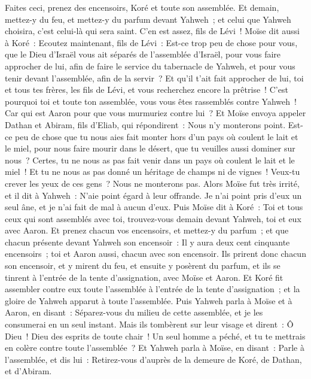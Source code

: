 \begin{multicols}{2}
Faites ceci, prenez des encensoirs, Koré et toute son assemblée.
Et demain, mettez-y du feu, et mettez-y du parfum devant Yahweh~; et celui que Yahweh choisira, c'est celui-là qui sera saint. C'en est assez, fils de Lévi~!
Moïse dit aussi à Koré~: Ecoutez maintenant, fils de Lévi~:
Est-ce trop peu de chose pour vous, que le Dieu d'Israël vous ait séparés de l'assemblée d'Israël, pour vous faire approcher de lui, afin de faire le service du tabernacle de Yahweh, et pour vous tenir devant l'assemblée, afin de la servir~?
Et qu'il t'ait fait approcher de lui, toi et tous tes frères, les fils de Lévi, et vous recherchez encore la prêtrise~!
C'est pourquoi toi et toute ton assemblée, vous vous êtes rassemblés contre Yahweh~! Car qui est Aaron pour que vous murmuriez contre lui~?
Et Moïse envoya appeler Dathan et Abiram, fils d'Eliab, qui répondirent~: Nous n'y monterons point.
Est-ce peu de chose que tu nous aies fait monter hors d'un pays où coulent le lait et le miel, pour nous faire mourir dans le désert, que tu veuilles aussi dominer sur nous~?
Certes, tu ne nous as pas fait venir dans un pays où coulent le lait et le miel~! Et tu ne nous as pas donné un héritage de champs ni de vignes~! Veux-tu crever les yeux de ces gens~? Nous ne monterons pas.
Alors Moïse fut très irrité, et il dit à Yahweh~: N'aie point égard à leur offrande. Je n'ai point pris d'eux un seul âne, et je n'ai fait de mal à aucun d'eux.
Puis Moïse dit à Koré~: Toi et tous ceux qui sont assemblés avec toi, trouvez-vous demain devant Yahweh, toi et eux avec Aaron.
Et prenez chacun vos encensoirs, et mettez-y du parfum~; et que chacun présente devant Yahweh son encensoir~: Il y aura deux cent cinquante encensoirs~; toi et Aaron aussi, chacun avec son encensoir.
Ils prirent donc chacun son encensoir, et y mirent du feu, et ensuite y posèrent du parfum, et ils se tinrent à l'entrée de la tente d'assignation, avec Moïse et Aaron.
Et Koré fit assembler contre eux toute l'assemblée à l'entrée de la tente d'assignation~; et la gloire de Yahweh apparut à toute l'assemblée.
Puis Yahweh parla à Moïse et à Aaron, en disant~:
Séparez-vous du milieu de cette assemblée, et je les consumerai en un seul instant.
Mais ils tombèrent sur leur visage et dirent~: Ô Dieu~! Dieu des esprits de toute chair~! Un seul homme a péché, et tu te mettrais en colère contre toute l'assemblée~?
Et Yahweh parla à Moïse, en disant~:
Parle à l'assemblée, et dis lui~: Retirez-vous d'auprès de la demeure de Koré, de Dathan, et d'Abiram.

\end{multicols}

